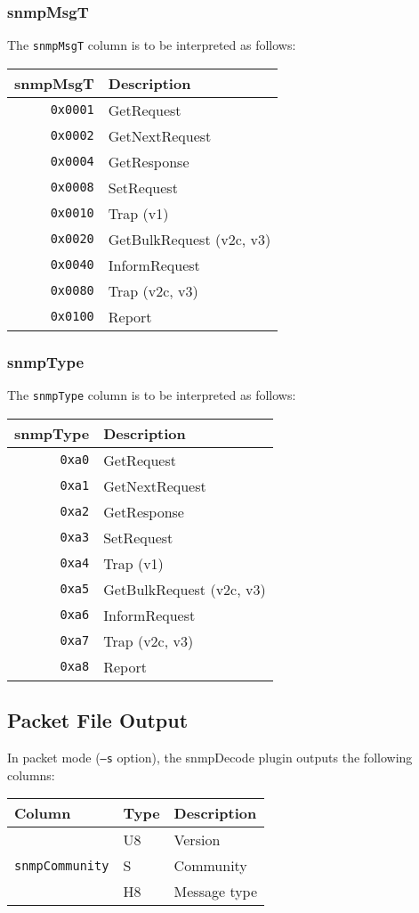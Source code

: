 \documentclass[documentation]{subfiles}
\begin{document}
\subsubsection{snmpMsgT}\label{snmpMsgT}
The {\tt snmpMsgT} column is to be interpreted as follows:
\begin{longtable}{rl}
    \toprule
    {\bf snmpMsgT} & {\bf Description}\\
    \midrule\endhead%
    {\tt 0x0001} & GetRequest\\
    {\tt 0x0002} & GetNextRequest\\
    {\tt 0x0004} & GetResponse\\
    {\tt 0x0008} & SetRequest\\
    {\tt 0x0010} & Trap (v1)\\
    {\tt 0x0020} & GetBulkRequest (v2c, v3)\\
    {\tt 0x0040} & InformRequest\\
    {\tt 0x0080} & Trap (v2c, v3)\\
    {\tt 0x0100} & Report\\
    \bottomrule
\end{longtable}

\subsubsection{snmpType}\label{snmpType}
The {\tt snmpType} column is to be interpreted as follows:
\begin{longtable}{rl}
    \toprule
    {\bf snmpType} & {\bf Description}\\
    \midrule\endhead%
    {\tt 0xa0} & GetRequest\\
    {\tt 0xa1} & GetNextRequest\\
    {\tt 0xa2} & GetResponse\\
    {\tt 0xa3} & SetRequest\\
    {\tt 0xa4} & Trap (v1)\\
    {\tt 0xa5} & GetBulkRequest (v2c, v3)\\
    {\tt 0xa6} & InformRequest\\
    {\tt 0xa7} & Trap (v2c, v3)\\
    {\tt 0xa8} & Report\\
    \bottomrule
\end{longtable}

\subsection{Packet File Output}
In packet mode ({\tt --s} option), the snmpDecode plugin outputs the following columns:
\begin{longtable}{lll}
    \toprule
    {\bf Column} & {\bf Type} & {\bf Description}\\
    \midrule\endhead%
    {\tt \nameref{snmpVersion}} & U8 & Version\\
    {\tt snmpCommunity} & S & Community\\
    {\tt \nameref{snmpType}} & H8 & Message type\\
    \bottomrule
\end{longtable}
\end{document}
